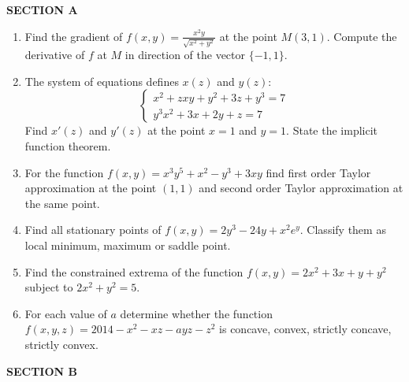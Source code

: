 \documentclass[A4,12pt]{article}
\begin{document}
\newpage

\textbf{SECTION A}

\begin{enumerate}
	\item Find the gradient of $f(x,y) =\frac{x^2y}{\sqrt{x^2+y^2}}$
at the point $M(3,1)$. Compute the derivative of $f$ at $M$ in direction of the vector $\{-1, 1\}$.
	\item The system of equations defines $x(z)$ and $y(z)$:
\begin{equation}
\begin{cases}
x^2+zxy+y^2+3z+y^3=7 \\
y^3x^2+3x+2y+z=7 \nonumber
\end{cases}
\end{equation}
Find $x'(z)$ and $y'(z)$ at the point $x=1$ and $y=1$. State the implicit function theorem.
 \item For the function $f(x,y)=x^3y^5+x^2-y^3+3xy$ find first order Taylor approximation at the point $(1,1)$ and second order Taylor approximation at the same point.
	\item Find all stationary points of $f(x,y) = 2y^3-24y+x^2e^y$. Classify them as local minimum, maximum or saddle point.
	\item Find the constrained extrema of the function $f(x,y)=2x^2+3x+y+y^2$ subject to $2x^2+y^2=5$.
	\item  For each value of $a$ determine whether the function $f(x,y,z)=2014-x^2-xz-ayz-z^2$ is concave, convex, strictly concave, strictly convex.
\end{enumerate}

\textbf{SECTION B}
\end{document}
